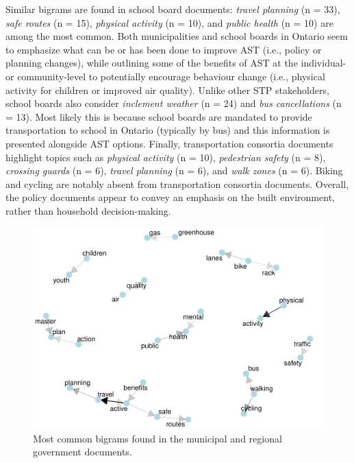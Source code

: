 \documentclass[]{elsarticle} %
\begin{document}
Similar bigrams are found in school board documents: \emph{travel
planning} (n = 33), \emph{safe routes} (n = 15), \emph{physical
activity} (n = 10), and \emph{public health} (n = 10) are among the most
common. Both municipalities and school boards in Ontario seem to
emphasize what can be or has been done to improve AST (i.e., policy or
planning changes), while outlining some of the benefits of AST at the
individual- or community-level to potentially encourage behaviour change
(i.e., physical activity for children or improved air quality). Unlike
other STP stakeholders, school boards also consider \emph{inclement
weather} (n = 24) and \emph{bus cancellations} (n = 13). Most likely
this is because school boards are mandated to provide transportation to
school in Ontario (typically by bus) and this information is presented
alongside AST options. Finally, transportation consortia documents
highlight topics such as \emph{physical activity} (n = 10),
\emph{pedestrian safety} (n = 8), \emph{crossing guards} (n = 6),
\emph{travel planning} (n = 6), and \emph{walk zones} (n = 6). Biking
and cycling are notably absent from transportation consortia documents.
Overall, the policy documents appear to convey an emphasis on the built
environment, rather than household decision-making.

\begin{figure}

{\centering \includegraphics[width=1\linewidth]{AST-Framing-Ontario_files/figure-latex/city-visual-1} 

}

\caption{\label{fig:city-visual}Most common bigrams found in the municipal and regional government documents.}\label{fig:city-visual}
\end{figure}
\end{document}
